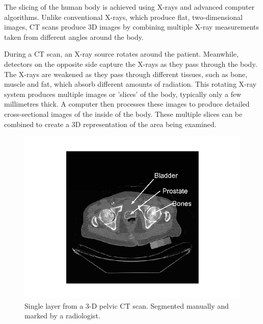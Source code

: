 The slicing of the human body is achieved using X-rays and advanced computer algorithms. Unlike conventional X-rays, which produce flat, two-dimensional images, CT scans produce 3D images by combining multiple X-ray measurements taken from different angles around the body. 

During a CT scan, an X-ray source rotates around the patient. Meanwhile, detectors on the opposite side capture the X-rays as they pass through the body. The X-rays are weakened as they pass through different tissues, such as bone, muscle and fat, which absorb different amounts of radiation. This rotating X-ray system produces multiple images or 'slices' of the body, typically only a few millimetres thick. A computer then processes these images to produce detailed cross-sectional images of the inside of the body. These multiple slices can be combined to create a 3D representation of the area being examined. 


\begin{figure}[H]
    \centering
    \includegraphics[width=0.9\linewidth]{background/A-typical-2-D-pelvic-CT-scan-Left-Manually-segmented-prostate-region-marked-by-a.png}
    \caption{Single layer from a 3-D pelvic CT scan. Segmented manually and marked by a radiologist\cite{inproceedings}.}
    \label{fig:enter-label}
\end{figure}

